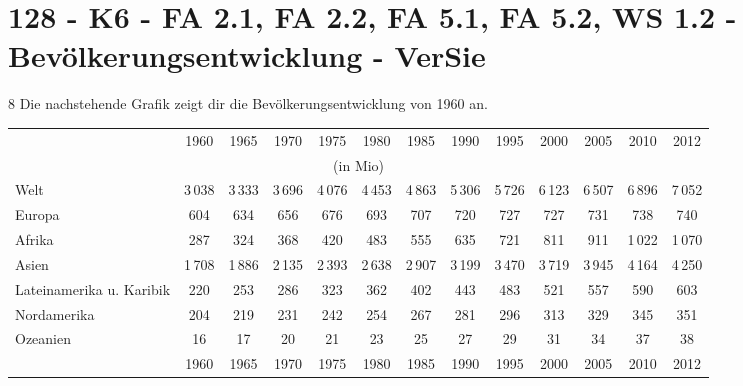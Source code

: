 \section{128 - K6 - FA 2.1, FA 2.2, FA 5.1, FA 5.2, WS 1.2 - Bevölkerungsentwicklung - VerSie}

\begin{langesbeispiel} \item[8] %
Die nachstehende Grafik zeigt dir die Bevölkerungsentwicklung von 1960 an.

\begin{tiny}


\begin{tabular}{lcccccccccccc}\hline
\cellcolor[gray]{0.5}&\cellcolor[gray]{0.5}1960&\cellcolor[gray]{0.5}1965&\cellcolor[gray]{0.5}1970&\cellcolor[gray]{0.5}1975&\cellcolor[gray]{0.5}1980&\cellcolor[gray]{0.5}1985&\cellcolor[gray]{0.5}1990&\cellcolor[gray]{0.5}1995&\cellcolor[gray]{0.5}2000&\cellcolor[gray]{0.5}2005&\cellcolor[gray]{0.5}2010&\cellcolor[gray]{0.5}2012\\
\multicolumn{13}{c}{\cellcolor[gray]{0.5}(in Mio)}\\ \hline
\cellcolor[gray]{0.9}Welt&\cellcolor[gray]{0.9}3\,038&\cellcolor[gray]{0.9}3\,333&\cellcolor[gray]{0.9}3\,696&\cellcolor[gray]{0.9}4\,076&\cellcolor[gray]{0.9}4\,453&\cellcolor[gray]{0.9}4\,863&\cellcolor[gray]{0.9}5\,306&\cellcolor[gray]{0.9}5\,726&\cellcolor[gray]{0.9}6\,123&\cellcolor[gray]{0.9}6\,507&\cellcolor[gray]{0.9}6\,896&\cellcolor[gray]{0.9}7\,052\\ \hline
\cellcolor[gray]{0.9}Europa&\cellcolor[gray]{0.9}604&\cellcolor[gray]{0.9}634&\cellcolor[gray]{0.9}656&\cellcolor[gray]{0.9}676&\cellcolor[gray]{0.9}693&\cellcolor[gray]{0.9}707&\cellcolor[gray]{0.9}720&\cellcolor[gray]{0.9}727&\cellcolor[gray]{0.9}727&\cellcolor[gray]{0.9}731&\cellcolor[gray]{0.9}738&\cellcolor[gray]{0.9}740\\ \hline
Afrika&287&324&368&420&483&555&635&721&811&911&1\,022&1\,070\\ \hline
Asien&1\,708&1\,886&2\,135&2\,393&2\,638&2\,907&3\,199&3\,470&3\,719&3\,945&4\,164&4\,250\\ \hline
Lateinamerika u. Karibik&220&253&286&323&362&402&443&483&521&557&590&603\\ \hline
Nordamerika&204&219&231&242&254&267&281&296&313&329&345&351\\ \hline
Ozeanien&16&17&20&21&23&25&27&29&31&34&37&38\\ \hline
\cellcolor[gray]{0.5}&\cellcolor[gray]{0.5}1960&\cellcolor[gray]{0.5}1965&\cellcolor[gray]{0.5}1970&\cellcolor[gray]{0.5}1975&\cellcolor[gray]{0.5}1980&\cellcolor[gray]{0.5}1985&\cellcolor[gray]{0.5}1990&\cellcolor[gray]{0.5}1995&\cellcolor[gray]{0.5}2000&\cellcolor[gray]{0.5}2005&\cellcolor[gray]{0.5}2010&\cellcolor[gray]{0.5}2012\\

\end{tabular}
\end{tiny}
\end{langesbeispiel}

